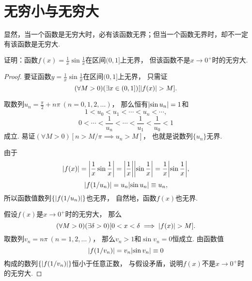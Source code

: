 \section{无穷小与无穷大}



显然，当一个函数是无穷大时，必有该函数无界；但当一个函数无界时，却不一定有该函数是无穷大.
\begin{example}
证明：函数\(f(x) = \frac{1}{x} \sin\frac{1}{x}\)在区间\((0,1]\)上无界，
但该函数不是\(x\to0^+\)时的无穷大.
\begin{proof}
要证函数\(y = \frac{1}{x} \sin\frac{1}{x}\)在区间\((0,1]\)上无界，
只需证\[
	(\forall M > 0)
	(\exists x \in (0,1])
	[\abs{f(x)} > M].
\]

取数列\(u_n = \frac{\pi}{2} + n\pi\ (n=0,1,2,\dotsc)\)，
那么恒有\(\abs{\sin u_n} = 1\)和\[
	1 < u_0 < u_1 < \dotsb < u_n < \dotsb,
\]\[
	0 < \dotsb < \frac{1}{u_n} < \dotsb < \frac{1}{u_1} < \frac{1}{u_0} < 1
\]成立.
易证\((\forall M > 0)[n > M/\pi \implies u_n > M]\)，
也就是说数列\(\{u_n\}\)无界.

由于\[
	\abs{f(x)} = \abs{\frac{1}{x} \sin\frac{1}{x}}
	= \abs{\frac{1}{x}} \abs{\sin\frac{1}{x}}
	= \frac{1}{x} \abs{\sin\frac{1}{x}},
\]\[
	\abs{f(1/u_n)}
	= u_n \abs{\sin u_n} \equiv u_n,
\]
所以函数值数列\(\{\abs{f(1/u_n)}\}\)也无界，
自然地，函数\(f(x)\)也无界.

假设\(f(x)\)是\(x\to0^+\)时的无穷大，
那么\[
	(\forall M > 0)
	(\exists \delta > 0)
	[
		0 < x < \delta
		\implies
		\abs{f(x)} > M
	].
\]
取数列\(v_n = n\pi\ (n=1,2,\dotsc)\)，
那么\(v_n > 1\)和\(\sin v_n = 0\)恒成立.
由函数值\[
	\abs{f(1/v_n)} = v_n \abs{\sin v_n} \equiv 0
\]构成的数列\(\{\abs{f(1/v_n)}\}\)恒小于任意正数，
与假设矛盾，说明\(f(x)\)不是\(x\to0^+\)时的无穷大.
\end{proof}
\end{example}
